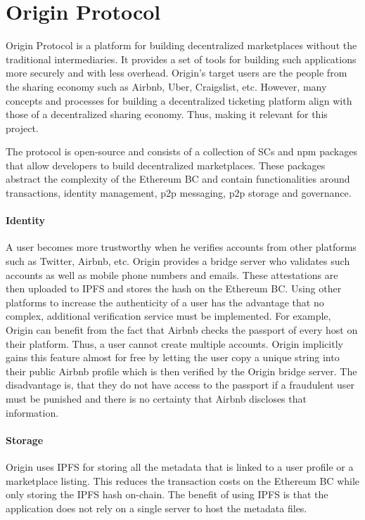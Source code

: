 
\section{Origin Protocol}
Origin Protocol \cite{origin-protocol-whitepaper} is a platform for building decentralized marketplaces without the traditional intermediaries. It provides a set of tools for building such applications more securely and with less overhead. Origin's target users are the people from the sharing economy such as Airbnb, Uber, Craigslist, etc. However, many concepts and processes for building a decentralized ticketing platform align with those of a decentralized sharing economy. Thus, making it relevant for this project.

The protocol is open-source and consists of a collection of SCs and npm packages that allow developers to build decentralized marketplaces. These packages abstract the complexity of the Ethereum BC and contain functionalities around transactions, identity management, p2p messaging, p2p storage and governance.


\paragraph{Identity}
A user becomes more trustworthy when he verifies accounts from other platforms such as Twitter, Airbnb, etc. Origin provides a bridge server who validates such accounts as well as mobile phone numbers and emails. These attestations are then uploaded to IPFS and stores the hash on the Ethereum BC. 
Using other platforms to increase the authenticity of a user has the advantage that no complex, additional verification service must be implemented. 
For example, Origin can benefit from the fact that Airbnb checks the passport of every host on their platform. Thus, a user cannot create multiple accounts. Origin implicitly gains this feature almost for free by letting the user copy a unique string into their public Airbnb profile which is then verified by the Origin bridge server.
The disadvantage is, that they do not have access to the passport if a fraudulent user must be punished and there is no certainty that Airbnb discloses that information.


\paragraph{Storage}
Origin uses IPFS for storing all the metadata that is linked to a user profile or a marketplace listing. This reduces the transaction costs on the Ethereum BC while only storing the IPFS hash on-chain. The benefit of using IPFS is that the application does not rely on a single server to host the metadata files. 

